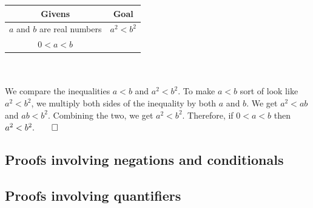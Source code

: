 \documentclass[../setup.tex]{subfiles}
\begin{document}
\begin{center}
	\begin{tabular}[t]{| c | c |}
		\hline
		Givens & Goal \\
		\hline
		$a$ and $b$ are real numbers & $a^2 < b ^2$ \\
		$0 < a < b$ &  \\
		\hline
	\end{tabular}
\end{center}
\phantom \\ \\
We compare the inequalities $a < b$ and $a^2 < b^2$. To make $a < b$ sort of look like $a^2 < b^2$, we multiply both sides of the inequality by both $a$ and $b$. We get $a^2 < ab$ and $ab < b^2$. Combining the two, we get $a^2 < b^2$. Therefore, if $0 < a < b$ then $a^2 < b^2. \qed$
\subsection{Proofs involving negations and conditionals}
\subsection{Proofs involving quantifiers}
\end{document}
